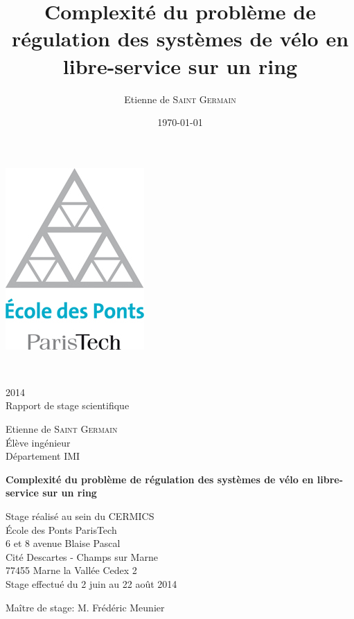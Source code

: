 \documentclass[twoside,11pt,openany,a4paper]{rapport}
\begin{document}
\title{Complexité du problème de régulation des systèmes de vélo en libre-service sur un ring}
\author{Etienne de \textsc{Saint Germain}}
\date{\today}

\mainmatter

\begin{titlepage}
  \begin{center}
    \includegraphics[scale=0.5]{logo_enpc.jpg}
    
    \vspace{0.3cm}
    \\
    
    \vspace{0.7cm}
    2014\\
    Rapport de stage scientifique
    
    \vspace{0.3cm}
    Etienne de \textsc{Saint Germain}\\
    Élève ingénieur\\
    Département IMI
    
    \vspace{2cm}
    {\Huge{\textbf{Complexité du problème de régulation des systèmes de vélo en libre-service sur un ring}}}
    
    \vfill
    {\huge{Stage réalisé au sein du CERMICS}}\\
    École des Ponts ParisTech\\
    6 et 8 avenue Blaise Pascal\\
    Cité Descartes - Champs sur Marne\\
    77455 Marne la Vallée Cedex 2\\

    \vspace{0.7cm}
    Stage effectué du 2 juin au 22 août 2014
    
    \vspace{0.3cm}
    Maître de stage: M. Frédéric Meunier

  \end{center}
\end{titlepage}
\end{document}
